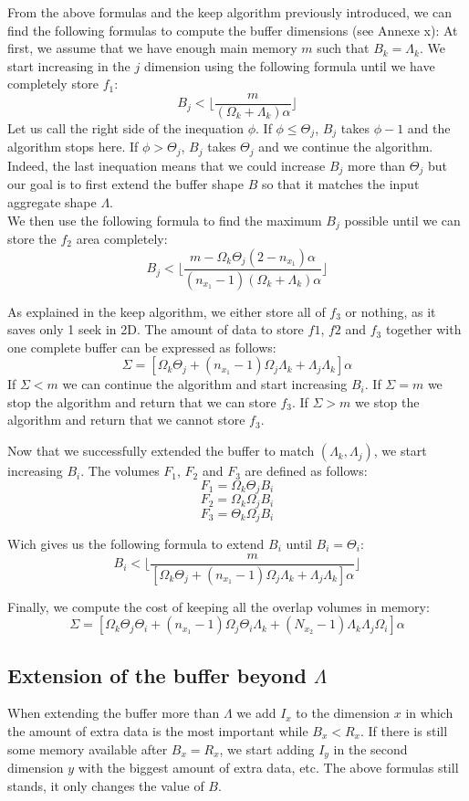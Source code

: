 \documentclass[conference]{IEEEtran}
\begin{document}
From the above formulas and the keep algorithm previously introduced, we can find the following formulas to compute the buffer dimensions (see Annexe x):
At first, we assume that we have enough main memory $m$ such that $B_k = \Lambda_k$.
We start increasing in the $j$ dimension using the following formula until we have completely store $f_1$:
$$B_j < \lfloor \frac{m}{(\Omega_k + \Lambda_k)\alpha} \rfloor$$
Let us call the right side of the inequation $\phi$.
If $\phi \leq \Theta_j$, $B_j$ takes $\phi-1$ and the algorithm stops here.
If $\phi > \Theta_j$, $B_j$ takes $\Theta_j$ and we continue the algorithm.
Indeed, the last inequation means that we could increase $B_j$ more than $\Theta_j$ but our goal is to first extend the buffer shape $B$ so that it matches the input aggregate shape $\Lambda$. \\

We then use the following formula to find the maximum $B_j$ possible until we can store the $f_2$ area completely:
$$B_j < \lfloor \frac{m - \Omega_k\Theta_j(2-n_{x_1})\alpha}{(n_{x_1}-1)(\Omega_k+\Lambda_k)\alpha} \rfloor$$

As explained in the keep algorithm, we either store all of $f_3$ or nothing, as it saves only 1 seek in 2D.
The amount of data to store $f1$, $f2$ and $f_3$ together with one complete buffer can be expressed as follows:
$$\Sigma = [\Omega_k\Theta_j + (n_{x_1}-1)\Omega_j\Lambda_k + \Lambda_j\Lambda_k]\alpha$$
If $\Sigma < m$ we can continue the algorithm and start increasing $B_i$.
If $\Sigma = m$ we stop the algorithm and return that we can store $f_3$.
If $\Sigma > m$ we stop the algorithm and return that we cannot store $f_3$.

Now that we successfully extended the buffer to match $(\Lambda_k, \Lambda_j)$, we start increasing $B_i$.
The volumes $F_1$, $F_2$ and $F_3$ are defined as follows:
$$F_1 = \Omega_k \Theta_j B_i$$
$$F_2 = \Omega_k \Omega_j B_i$$
$$F_3 = \Theta_k \Omega_j B_i$$

Wich gives us the following formula to extend $B_i$ until $B_i = \Theta_i$:
$$B_i < \lfloor \frac{m}{[\Omega_k\Theta_j + (n_{x_1}-1)\Omega_j\Lambda_k + \Lambda_j\Lambda_k]\alpha} \rfloor$$

Finally, we compute the cost of keeping all the overlap volumes in memory:
$$\Sigma = [\Omega_k\Theta_j\Theta_i + (n_{x_1}-1)\Omega_j\Theta_i\Lambda_k + (N_{x_2}-1)\Lambda_k\Lambda_j\Omega_i]\alpha$$

\subsection{Extension of the buffer beyond $\Lambda$}
When extending the buffer more than $\Lambda$ we add $I_x$ to the dimension $x$ in which the amount of extra data is the most important while $B_x < R_x$.
If there is still some memory available after $B_x=R_x$, we start adding $I_y$ in the second dimension $y$ with the biggest amount of extra data, etc.
The above formulas still stands, it only changes the value of $B$. \\
\end{document}
